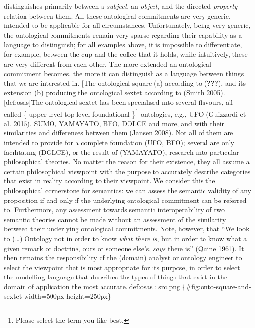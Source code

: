 \documentclass[a4paper,11pt,oneside,oldfontcommands]{memoir}
\theoremstyle{definition}
\theoremstyle{break}		%
\numberwithin{equation}{chapter}
\numberwithin{figure}{chapter}
\begin{document}
distinguishes primarily between a \emph{subject}, an \emph{object}, and
the directed \emph{property} relation between them. All these
ontological commitments are very generic, intended to be applicable for
all circumstances. Unfortunately, being very generic, the ontological
commitments remain very sparse regarding their capability as a language
to distinguish; for all examples above, it is impossible to
differentiate, for example, between the cup and the coffee that it
holds, while intuitively, these are very different from each other. The
more extended an ontological commitment becomes, the more it can
distinguish as a language between things that we are interested in.
{[}The ontological square (a) according to ({\textbf{???}}), and its
extension (b) producing the ontological sextet according to (Smith
2005).{]}{[}def:osas{]}The ontological sextet has been specialised into
several flavours, all called \{ upper-level \textbar{} top-level
\textbar{} foundational \}\footnote{Please select the term you like
  best.} ontologies, e.g., UFO (Guizzardi et al. 2015), SUMO, YAMAYATO,
BFO, DOLCE and more, and with their similarities and differences between
them (Jansen 2008). Not all of them are intended to provide for a
complete foundation (UFO, BFO); several are only facilitating (DOLCE),
or the result of (YAMAYATO), research into particular philosophical
theories. No matter the reason for their existence, they all assume a
certain philosophical viewpoint with the purpose to accurately describe
categories that exist in reality according to their viewpoint. We
consider this the philosophical cornerstone for semantics: we can assess
the semantic validity of any proposition if and only if the underlying
ontological commitment can be referred to. Furthermore, any assessment
towards semantic interoperability of two semantic theories cannot be
made without an assessment of the similarity between their underlying
ontological commitments. Note, however, that ``We look to (\ldots{})
Ontology not in order to know \emph{what there is}, but in order to know
what a given remark or doctrine, ours or someone else's, \emph{says}
there is'' (Quine 1961). It then remains the responsibility of the
(domain) analyst or ontology engineer to select the viewpoint that is
most appropriate for its purpose, in order to select the modelling
language that describes the types of things that exist in the domain of
application the most accurate.{[}def:osas{]}:
src\images\OntoSquareAndSextet.png \{\#fig:onto-square-and-sextet
width=500px height=250px\}
\end{document}
